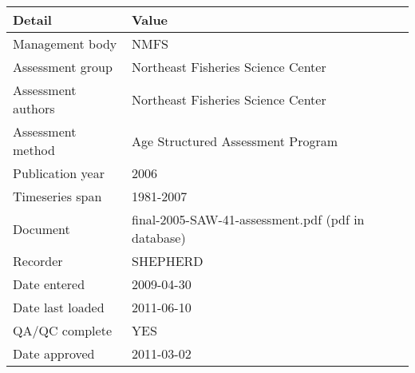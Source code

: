 \begin{table}[htb]
\centering
\begin{tabular}{lp{7cm}}
\toprule
Detail & Value \\
\midrule
Management body    & NMFS                                               \\
Assessment group   & Northeast Fisheries Science Center                 \\
Assessment authors & Northeast Fisheries Science Center                 \\
Assessment method  & Age Structured Assessment Program                  \\
Publication year   & 2006                                               \\
Timeseries span    & 1981-2007                                          \\
Document           & final-2005-SAW-41-assessment.pdf (pdf in database) \\
Recorder           & SHEPHERD                                           \\
Date entered       & 2009-04-30                                         \\
Date last loaded   & 2011-06-10                                         \\
QA/QC complete     & YES                                                \\
Date approved      & 2011-03-02                                         \\
\bottomrule
\end{tabular}
\label{tab:assessdet}
\end{table}

